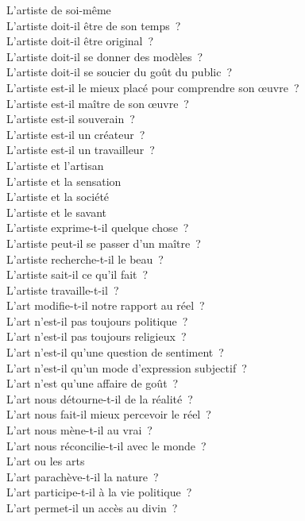 \documentclass[a4paper,12pt]{article}
\begin{document}
L'artiste de soi-même \\
L'artiste doit-il être de son temps ? \\
L'artiste doit-il être original ? \\
L'artiste doit-il se donner des modèles ? \\
L'artiste doit-il se soucier du goût du public ? \\
L'artiste est-il le mieux placé pour comprendre son œuvre ? \\
L'artiste est-il maître de son œuvre ? \\
L'artiste est-il souverain ? \\
L'artiste est-il un créateur ? \\
L'artiste est-il un travailleur ? \\
L'artiste et l'artisan \\
L'artiste et la sensation \\
L'artiste et la société \\
L'artiste et le savant \\
L'artiste exprime-t-il quelque chose ? \\
L'artiste peut-il se passer d'un maître ? \\
L'artiste recherche-t-il le beau ? \\
L'artiste sait-il ce qu'il fait ? \\
L'artiste travaille-t-il ? \\
L'art modifie-t-il notre rapport au réel ? \\
L'art n'est-il pas toujours politique ? \\
L'art n'est-il pas toujours religieux ? \\
L'art n'est-il qu'une question de sentiment ? \\
L'art n'est-il qu'un mode d'expression subjectif ? \\
L'art n'est qu'une affaire de goût ? \\
L'art nous détourne-t-il de la réalité ? \\
L'art nous fait-il mieux percevoir le réel ? \\
L'art nous mène-t-il au vrai ? \\
L'art nous réconcilie-t-il avec le monde ? \\
L'art ou les arts \\
L'art parachève-t-il la nature ? \\
L'art participe-t-il à la vie politique ? \\
L'art permet-il un accès au divin ? \\
\end{document}
